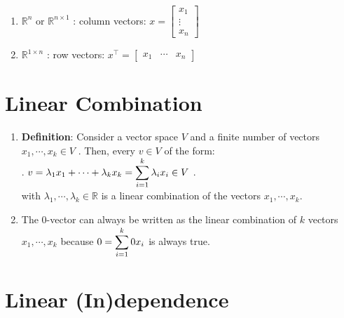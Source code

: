 \begin{enumerate}
    \item $\mathbb{R}^n$ or $\mathbb{R}^{n\times 1}$ : column vectors: 
    $
        x = 
        \begin{bmatrix}
            x_1\\ \vdots \\ x_n
        \end{bmatrix}
    $
    \hfill \cite{mfml/book/mml/Deisenroth-Faisal-Ong}

    \item $\mathbb{R}^{1\times n}$ : row vectors: 
    $
        x^\top = \begin{bmatrix}x_1 & \cdots & x_n\end{bmatrix}
    $
    \hfill \cite{mfml/book/mml/Deisenroth-Faisal-Ong}
\end{enumerate}













\section{Linear Combination}

\begin{enumerate}
    \item \textbf{Definition}: Consider a vector space $V$ and a finite number of vectors $x_1, \cdots , x_k \in V$ . Then, every $v \in V$ of the form:
    \\
    .\hfill
    $
        v = \lambda _1 x_1 + \cdots + \lambda _k x_k
        = \displaystyle\sum_{i=1}^k \lambda _i x_i
        \in V
    $
    \hfill.
    \\
    with $\lambda _1, \cdots , \lambda _k \in \mathbb{R}$ is a linear combination of the vectors $x_1, \cdots , x_k$.
    \hfill \cite{mfml/book/mml/Deisenroth-Faisal-Ong}

    \item The $0$-vector can always be written as the linear combination of $k$ vectors $x_1, \cdots , x_k$ because $0 = \displaystyle\sum ^k _{i=1} 0 x_i$ is always true.
    \hfill \cite{mfml/book/mml/Deisenroth-Faisal-Ong}

    
\end{enumerate}



\section{Linear (In)dependence}

